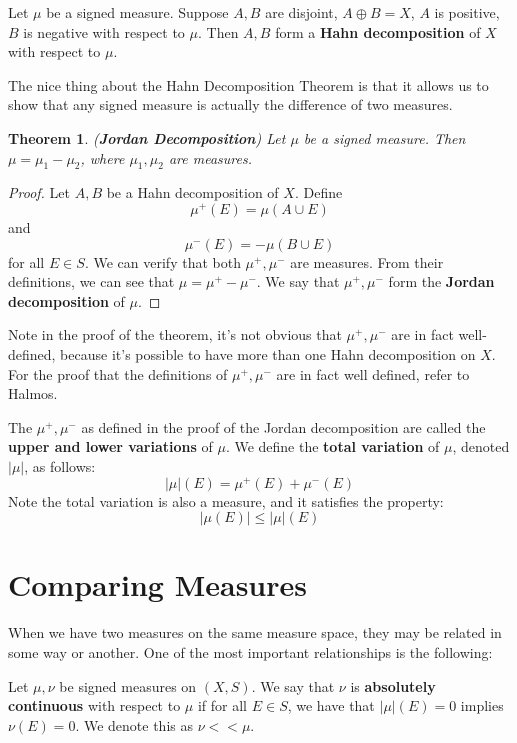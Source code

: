 \documentclass[a4paper,12pt]{report}
\newtheorem{theorem}{Theorem}[section]
\newenvironment{definition}[1][Definition.]{\begin{trivlist}
\item[\hskip \labelsep {\bfseries #1}]}{\end{trivlist}}
\begin{document}
	\begin{definition}
	Let $\mu$ be a signed measure. Suppose $A, B$ are disjoint, $A \oplus B = X$, $A$ is positive, $B$ is negative with respect to $\mu$. Then $A, B$ form a \textbf{Hahn decomposition} of $X$ with respect to $\mu$.
	\end{definition}
	
	\noindent The nice thing about the Hahn Decomposition Theorem is that it allows us to show that any signed measure is actually the difference of two measures. 
	
	\begin{theorem}
	\emph{(\textbf{Jordan Decomposition})}
	Let $\mu$ be a signed measure. Then $\mu = \mu_1 - \mu_2$, where $\mu_1, \mu_2$ are measures.	
	\end{theorem}
	\begin{proof}
	Let $A, B$ be a Hahn decomposition of $X$. Define 
	\[ \mu^+(E) = \mu(A \cup E)\] 
	and 
	\[ \mu^-(E) = -\mu(B \cup E)\] 
	for all $E \in S$. We can verify that both $\mu^+, \mu^-$ are measures. From their definitions, we can see that $\mu = \mu^+ - \mu^-$. We say that $\mu^+, \mu^-$ form the \textbf{Jordan decomposition} of $\mu$.
	\end{proof}
	
	\noindent Note in the proof of the theorem, it's not obvious that $\mu^+, \mu^-$ are in fact well-defined, because it's possible to have more than one Hahn decomposition on $X$. For the proof that the definitions of $\mu^+, \mu^-$ are in fact well defined, refer to Halmos.
	
	\begin{definition}
	The $\mu^+,\mu^-$ as defined in the proof of the Jordan decomposition are called the \textbf{upper and lower variations} of $\mu$. We define the \textbf{total variation} of $\mu$, denoted $|\mu|$, as follows:
	\[ |\mu|(E) = \mu^+(E) + \mu^-(E) \]
	Note the total variation is also a measure, and it satisfies the property:
	\[ |\mu(E)| \leq |\mu|(E) \]
	\end{definition}
	
	\section{Comparing Measures}	
	
	When we have two measures on the same measure space, they may be related in some way or another. One of the most important relationships is the following:
	
	\begin{definition}
	Let $\mu, \nu$ be signed measures on $(X, S)$. We say that $\nu$ is \textbf{absolutely continuous} with respect to $\mu$ if for all $E \in S$, we have that $|\mu|(E) = 0$ implies $\nu(E) = 0$. We denote this as $\nu << \mu$. 
	\end{definition}
	
\end{document}
